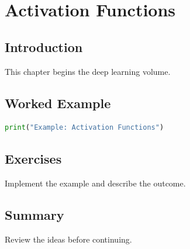 \chapter{Activation Functions}
\label{chap:vol7-3}



\section{Introduction}
This chapter begins the deep learning volume.

\section{Worked Example}
\begin{lstlisting}[language=Python]
print("Example: Activation Functions")
\end{lstlisting}

\section{Exercises}
\begin{exercise}
Implement the example and describe the outcome.
\end{exercise}

\section{Summary}
Review the ideas before continuing.
